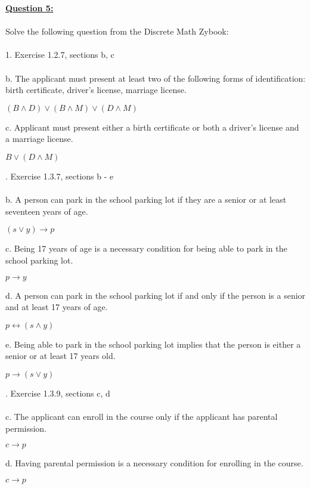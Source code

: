 \documentclass[11pt]{article}
\begin{document}
{\begin{center}
\begin{tabular}{ |c|c|c|c|c|c| }
 \hline
\end{tabular}
\end{center} 
\pagebreak

\noindent \textbf{\ul{Question 5:}} \\
\\
Solve the following question from the Discrete Math Zybook:\\\\
1. Exercise 1.2.7, sections b, c \\\\
b. The applicant must present at least two of the following forms of identification: birth certificate, driver's license, marriage license. \\
\begin{center}
$(B \wedge D) \vee (B \wedge M) \vee (D \wedge M)$ 
\end{center}
c. Applicant must present either a birth certificate or both a driver's license and a marriage license.\\
\begin{center}
$B \vee (D \wedge M) $
\end{center}
 
. Exercise 1.3.7, sections b - e \\
\\
b. A person can park in the school parking lot if they are a senior or at least seventeen years of age. \\
\begin{center}
$ (s \vee y) \rightarrow p $
\end{center}
c. Being 17 years of age is a necessary condition for being able to park in the school parking lot. \\
\begin{center}
$ p \rightarrow y $
\end{center}
d. A person can park in the school parking lot if and only if the person is a senior and at least 17 years of age.\\
 \begin{center}
 $ p \leftrightarrow (s \wedge y) $
 \end{center}
e. Being able to park in the school parking lot implies that the person is either a senior or at least 17 years old.\\
 \begin{center}
 $ p \rightarrow (s \vee y) $
 \end{center}
. Exercise 1.3.9, sections c, d \\\\
c. The applicant can enroll in the course only if the applicant has parental permission.\\
\begin{center}
$ c \rightarrow p $
\end{center}
d. Having parental permission is a necessary condition for enrolling in the course.\\
\begin{center}
$ c \rightarrow p $
\end{center}
\pagebreak

}
\end{document}
